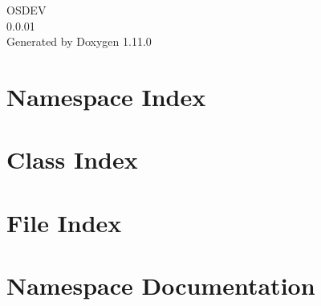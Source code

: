 \documentclass[twoside]{book}
\newcommand{\+}{\discretionary{\mbox{\scriptsize$\hookleftarrow$}}{}{}}
\newcommand{\clearemptydoublepage}{%
    \newpage{\pagestyle{empty}\cleardoublepage}%
  }
\begin{document}
  \raggedbottom
    \hypersetup{pageanchor=false,
                bookmarksnumbered=true,
                pdfencoding=unicode
               }
  \begin{titlepage}
  \vspace*{7cm}
  \begin{center}%
  {\Large OSDEV}\\
  [1ex]\large 0.\+0.\+01 \\
  \vspace*{1cm}
  {\large Generated by Doxygen 1.11.0}\\
  \end{center}
  \end{titlepage}
  \clearemptydoublepage
  \tableofcontents
  \clearemptydoublepage
  \hypersetup{pageanchor=true}
\chapter{Namespace Index}

\chapter{Class Index}

\chapter{File Index}

\chapter{Namespace Documentation}







\end{document}
